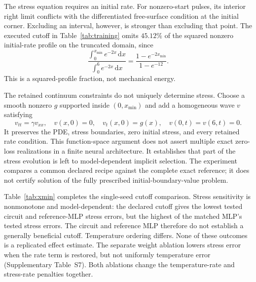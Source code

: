 \documentclass[11pt]{article}
\newcommand{\dd}{\mathrm d}
\begin{document}
The stress equation requires an initial rate. For nonzero-start pulses,
its interior right limit conflicts with the differentiated free-surface
condition at the initial corner. Excluding an interval, however, is
stronger than excluding that point. The executed cutoff in
Table~\ref{tab:training} omits $45.12\%$ of the squared nonzero initial-rate
profile on the truncated domain, since
\begin{equation}
 \frac{\int_0^{x_{\min}}e^{-2x}\,\dd x}
 {\int_0^{6}e^{-2x}\,\dd x}
 =\frac{1-e^{-2x_{\min}}}{1-e^{-12}}.
\end{equation}
This is a squared-profile fraction, not mechanical energy.

The retained continuum constraints do not uniquely determine stress.
Choose a smooth nonzero $g$ supported inside $(0,x_{\min})$ and add a
homogeneous wave $v$ satisfying
\begin{equation}
 v_{tt}=\gamma v_{xx},\quad v(x,0)=0,\quad v_t(x,0)=g(x),\quad
 v(0,t)=v(6,t)=0.
\end{equation}
It preserves the PDE, stress boundaries, zero initial stress, and every
retained rate condition. This function-space argument does not assert
multiple exact zero-loss realizations in a finite neural architecture.
It establishes that part of the stress evolution is left to
model-dependent implicit selection. The experiment compares a common
declared recipe against the complete exact reference; it does not certify
solution of the fully prescribed initial-boundary-value problem.

Table~\ref{tab:xmin} completes the single-seed cutoff comparison.
Stress sensitivity is nonmonotone and model-dependent: the declared
cutoff gives the lowest tested circuit and reference-MLP stress errors,
but the highest of the matched MLP's tested stress errors. The circuit
and reference MLP therefore do not establish a generally beneficial
cutoff. Temperature ordering differs. None of these outcomes is a
replicated effect estimate. The separate weight ablation lowers stress
error when the rate term is restored, but not uniformly temperature
error (Supplementary Table~S7). Both ablations change the temperature-rate
and stress-rate penalties together.
\end{document}
